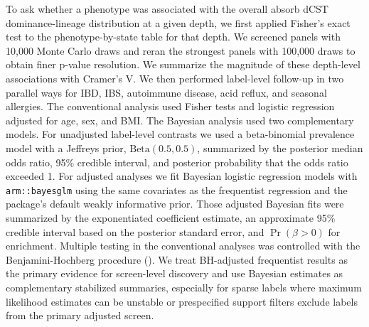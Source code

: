 \documentclass[
  11pt,
]{article}
\begin{document}
To ask whether a phenotype was associated with the overall absorb dCST
dominance-lineage distribution at a given depth, we first applied Fisher's exact test to
the phenotype-by-state table for that depth. We screened panels with
10,000 Monte Carlo draws and reran the strongest panels with 100,000
draws to obtain finer p-value resolution. We summarize the magnitude of
these depth-level associations with Cramer's V. We then performed
label-level follow-up in two parallel ways for IBD, IBS, autoimmune
disease, acid reflux, and seasonal allergies. The conventional analysis
used Fisher tests and logistic regression adjusted for age, sex, and BMI.
The Bayesian analysis used two complementary models. For unadjusted
label-level contrasts we used a beta-binomial prevalence model with a
Jeffreys prior, \(\mathrm{Beta}(0.5, 0.5)\), summarized by the posterior
median odds ratio, 95\% credible interval, and posterior probability
that the odds ratio exceeded 1. For adjusted analyses we fit Bayesian
logistic regression models with \texttt{arm::bayesglm} using the same
covariates as the frequentist regression and the package's default
weakly informative prior. Those adjusted Bayesian fits were summarized
by the exponentiated coefficient estimate, an approximate 95\% credible
interval based on the posterior standard error, and \(\Pr(\beta > 0)\)
for enrichment. Multiple testing in the conventional analyses was
controlled with the Benjamini-Hochberg procedure
().
We treat BH-adjusted frequentist results as the primary evidence for
screen-level discovery and use Bayesian estimates as complementary
stabilized summaries, especially for sparse labels where maximum
likelihood estimates can be unstable or prespecified support filters
exclude labels from the primary adjusted screen.
\end{document}
